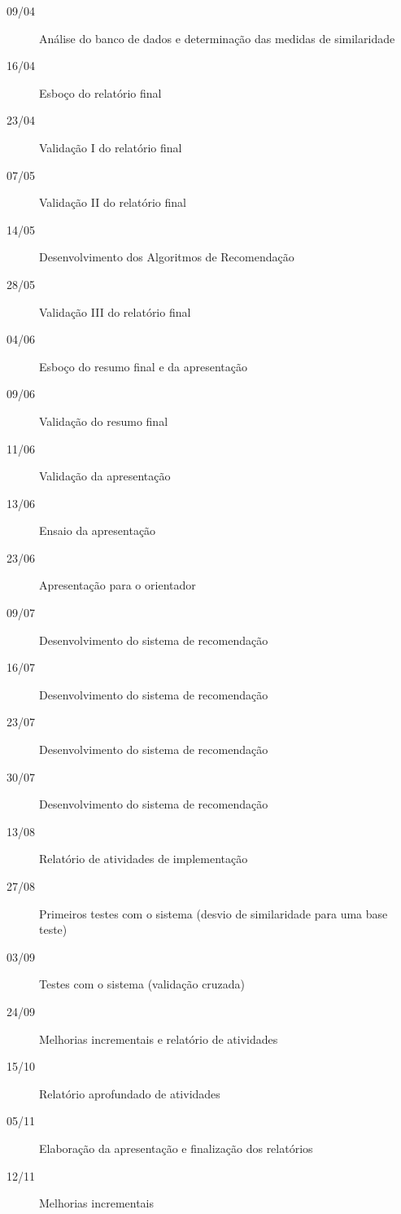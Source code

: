 \begin{description}
 	\item[09/04] Análise do banco de dados e determinação das medidas de similaridade
 	\item[16/04] Esboço do relatório final
 	\item[23/04] Validação I do relatório final
 	\item[07/05] Validação II do relatório final
 	\item[14/05] Desenvolvimento dos Algoritmos de Recomendação 
 	\item[28/05] Validação III do relatório final
 	\item[04/06] Esboço do resumo final e da apresentação
 	\item[09/06] Validação do resumo final
 	\item[11/06] Validação da apresentação
 	\item[13/06] Ensaio da apresentação
 	\item[23/06] Apresentação para o orientador
 	\item[]
 	\item[09/07] Desenvolvimento do sistema de recomendação
 	\item[16/07] Desenvolvimento do sistema de recomendação
 	\item[23/07] Desenvolvimento do sistema de recomendação
 	\item[30/07] Desenvolvimento do sistema de recomendação
 	\item[13/08] Relatório de atividades de implementação
 	\item[27/08] Primeiros testes com o sistema (desvio de similaridade para uma base teste)
 	\item[03/09] Testes com o sistema (validação cruzada)
 	\item[24/09] Melhorias incrementais e relatório de atividades
 	\item[15/10] Relatório aprofundado de atividades
 	\item[05/11] Elaboração da apresentação e finalização dos relatórios
 	\item[12/11] Melhorias incrementais
 \end{description} 